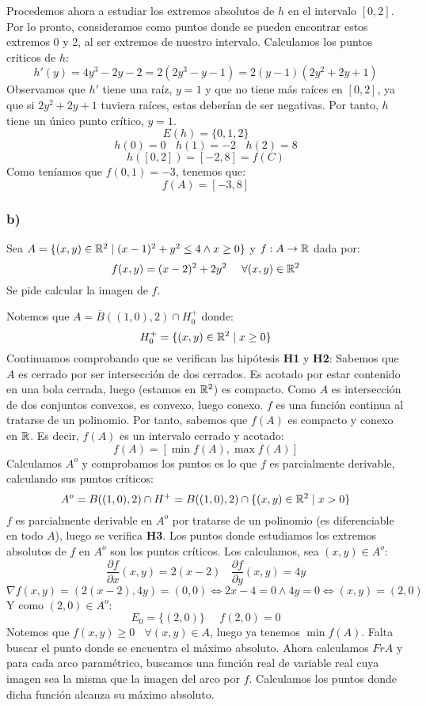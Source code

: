 \noindent
Procedemos ahora a estudiar los extremos absolutos de $h$ en el intervalo $[0,2]$. Por lo pronto, consideramos como puntos donde se pueden encontrar estos extremos 0 y 2, al ser extremos de nuestro intervalo. Calculamos los puntos críticos de $h$:
$$h'(y) = 4y^3 - 2y - 2 = 2(2y^3-y-1) = 2(y-1)(2y^2+2y+1)$$
Observamos que $h'$ tiene una raíz, $y=1$ y que no tiene más raíces en $[0,2]$, ya que si $2y^2+2y+1$ tuviera raíces, estas deberían de ser negativas. Por tanto, $h$ tiene un único punto crítico, $y=1$.
$$E(h) = \{0,1,2\}$$
$$h(0) = 0~~~~h(1)=-2~~~~h(2) = 8$$
$$h([0,2]) = [-2,8] = f(C)$$
Como teníamos que $f(0,1) = -3$, tenemos que:
$$f(A) = [-3,8]$$

\subsubsection{b)}
Sea $A = \{(x,y) \in \mathbb R^2 \mid (x-1)^2 + y^2 \leq 4 \land x \geq 0 \}$ y $f:A \rightarrow \mathbb R$ dada por:
$$f(x,y) = (x-2)^2+2y^2~~~~\forall (x,y) \in \mathbb R^2$$
Se pide calcular la imagen de $f$.
\vspace{.5cm}

\noindent
Notemos que $A = \overline{B}((1,0),2) \cap H^+_0$ donde:
$$H^+_0 = \{(x,y) \in \mathbb R^2 \mid x \geq 0\}$$
Continuamos comprobando que se verifican las hipótesis \textbf{H1} y \textbf{H2}:
Sabemos que $A$ es cerrado por ser intersección de dos cerrados. Es acotado por estar contenido en una bola cerrada, luego (estamos en $\mathbb R^2$) es compacto.\newline
Como $A$ es intersección de dos conjuntos convexos, es convexo, luego conexo.\newline
$f$ es una función continua al tratarse de un polinomio. Por tanto, sabemos que $f(A)$ es compacto y conexo en $\mathbb R$. Es decir, $f(A)$ es un intervalo cerrado y acotado:
$$f(A) = [\min f(A), \max f(A)]$$
Calculamos $A^o$ y comprobamos los puntos es lo que $f$ es parcialmente derivable, calculando sus puntos críticos:
$$A^o = B((1,0),2) \cap H^+ = B((1,0),2) \cap \{(x,y) \in \mathbb R^2 \mid x>0\}$$
$f$ es parcialmente derivable en $A^o$ por tratarse de un polinomio (es diferenciable en todo $A$), luego se verifica \textbf{H3}. Los puntos donde estudiamos los extremos absolutos de $f$ en $A^o$ son los puntos críticos. Los calculamos, sea $(x,y) \in A^o$:
$$\dfrac{\partial f}{\partial x}(x,y) = 2(x-2)~~~~\dfrac{\partial f}{\partial y}(x,y) = 4y$$
$$\nabla f(x,y) = (2(x-2), 4y) = (0,0) \Leftrightarrow 2x-4 = 0 \land 4y = 0 \Leftrightarrow (x,y) = (2,0)$$
Y como $(2,0) \in A^o$:
$$E_0 = \{(2,0)\}~~~~~~f(2,0) = 0$$
Notemos que $f(x,y) \geq 0~~~~\forall (x,y) \in A$, luego ya tenemos $\min f(A)$. Falta buscar el punto donde se encuentra el máximo absoluto.
Ahora calculamos $FrA$ y para cada arco paramétrico, buscamos una función real de variable real cuya imagen sea la misma que la imagen del arco por $f$. Calculamos los puntos donde dicha función alcanza su máximo absoluto.
\vspace{.5cm}

